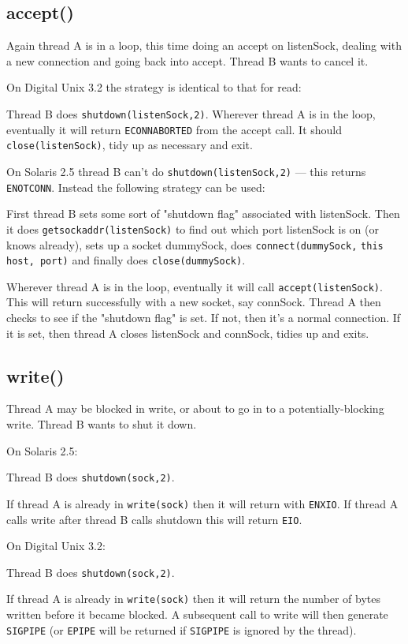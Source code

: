 \documentclass[11pt,twoside,a4paper]{article}
\begin{document}
\subsection{accept()}

Again thread A is in a loop, this time doing an accept on listenSock,
dealing with a new connection and going back into accept.  Thread B
wants to cancel it.

On Digital Unix 3.2 the strategy is identical to that for read:

Thread B does \verb|shutdown(listenSock,2)|.  Wherever thread A is in
the loop, eventually it will return \verb|ECONNABORTED| from the
accept call.  It should \verb|close(listenSock)|, tidy up as necessary
and exit.

On Solaris 2.5 thread B can't do \verb|shutdown(listenSock,2)| ---
this returns \verb|ENOTCONN|.  Instead the following strategy can be
used:

First thread B sets some sort of "shutdown flag" associated with
listenSock.  Then it does \verb|getsockaddr(listenSock)| to find out
which port listenSock is on (or knows already), sets up a socket
dummySock, does \verb|connect(dummySock,| \verb|this host, port)| and
finally does \verb|close(dummySock)|.

Wherever thread A is in the loop, eventually it will call
\verb|accept(listenSock)|.  This will return successfully with a new
socket, say connSock.  Thread A then checks to see if the "shutdown
flag" is set.  If not, then it's a normal connection.  If it is set,
then thread A closes listenSock and connSock, tidies up and exits.


\subsection{write()}

Thread A may be blocked in write, or about to go in to a
potentially-blocking write.  Thread B wants to shut it down.

On Solaris 2.5:

Thread B does \verb|shutdown(sock,2)|.

If thread A is already in \verb|write(sock)| then it will return with
\verb|ENXIO|.  If thread A calls write after thread B calls shutdown
this will return \verb|EIO|.


On Digital Unix 3.2:

Thread B does \verb|shutdown(sock,2)|.

If thread A is already in \verb|write(sock)| then it will return the
number of bytes written before it became blocked.  A subsequent call
to write will then generate \verb|SIGPIPE| (or \verb|EPIPE| will be
returned if \verb|SIGPIPE| is ignored by the thread).
\end{document}
